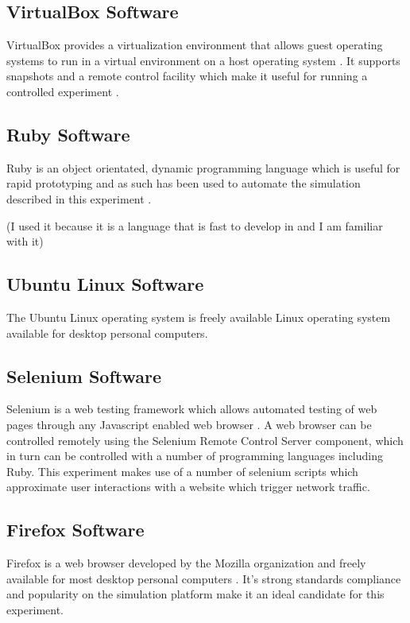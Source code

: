 \subsection{VirtualBox Software}

VirtualBox provides a virtualization environment that allows guest operating
systems to run in a virtual environment on a host operating system
\parencite{:fk}. It supports snapshots and a remote control facility which make
it useful for running a controlled experiment \parencite{:uq}.

\subsection{Ruby Software}

Ruby is an object orientated, dynamic programming language which is useful for
rapid prototyping and as such has been used to automate the simulation
described in this experiment \parencite{:2010uq}.

(I used it because it is a language that is fast to develop in and I am
familiar with it)

\subsection{Ubuntu Linux Software}

The Ubuntu Linux operating system is freely available Linux operating system
available for desktop personal computers.

\cite{:2010ly}

\subsection{Selenium Software}

Selenium is a web testing framework which allows automated testing of web pages
through any Javascript enabled web browser \parencite{:2010ys}. A web browser
can be controlled remotely using the Selenium Remote Control Server component,
which in turn can be controlled with a number of programming languages including
Ruby. This experiment makes use of a number of selenium scripts which
approximate user interactions with a website which trigger network traffic. 

\subsection{Firefox Software}

Firefox is a web browser developed by the Mozilla organization and freely
available for most desktop personal computers \parencite{mozilla}. It's strong
standards compliance \parencite{Hammond:2010fk} and popularity
\parencite{:2010kx,:2010vn} on the simulation platform make it an ideal
candidate for this experiment.

